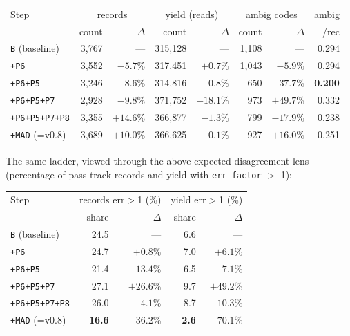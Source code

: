 \documentclass[11pt]{article}
\begin{document}
\begin{center}
\begin{tabular}{l rr rr rr r}
\toprule
Step & \multicolumn{2}{c}{records} & \multicolumn{2}{c}{yield (reads)} & \multicolumn{2}{c}{ambig codes} & ambig \\
& count & $\Delta$ & count & $\Delta$ & count & $\Delta$ & /rec \\
\midrule
\texttt{B} (baseline) & 3,767 & --- & 315,128 & --- & 1,108 & --- & 0.294 \\
\texttt{+P6} & 3,552 & $-5.7\%$ & 317,451 & $+0.7\%$ & 1,043 & $-5.9\%$ & 0.294 \\
\texttt{+P6+P5} & 3,246 & $-8.6\%$ & 314,816 & $-0.8\%$ & 650 & $\mathbf{-37.7\%}$ & \textbf{0.200} \\
\texttt{+P6+P5+P7} & 2,928 & $-9.8\%$ & 371,752 & $\mathbf{+18.1\%}$ & 973 & $+49.7\%$ & 0.332 \\
\texttt{+P6+P5+P7+P8} & 3,355 & $+14.6\%$ & 366,877 & $-1.3\%$ & 799 & $\mathbf{-17.9\%}$ & 0.238 \\
\texttt{+MAD} (=v0.8) & 3,689 & $+10.0\%$ & 366,625 & $-0.1\%$ & 927 & $+16.0\%$ & 0.251 \\
\bottomrule
\end{tabular}
\end{center}

The same ladder, viewed through the above-expected-disagreement lens
(percentage of pass-track records and yield with \texttt{err\_factor}
$>$ 1):

\begin{center}
\begin{tabular}{l rr rr}
\toprule
Step & \multicolumn{2}{c}{records err$>$1 (\%)} & \multicolumn{2}{c}{yield err$>$1 (\%)} \\
& share & $\Delta$ & share & $\Delta$ \\
\midrule
\texttt{B} (baseline) & 24.5 & --- & 6.6 & --- \\
\texttt{+P6} & 24.7 & $+0.8\%$ & 7.0 & $+6.1\%$ \\
\texttt{+P6+P5} & 21.4 & $\mathbf{-13.4\%}$ & 6.5 & $-7.1\%$ \\
\texttt{+P6+P5+P7} & 27.1 & $+26.6\%$ & 9.7 & $\mathbf{+49.2\%}$ \\
\texttt{+P6+P5+P7+P8} & 26.0 & $-4.1\%$ & 8.7 & $-10.3\%$ \\
\texttt{+MAD} (=v0.8) & \textbf{16.6} & $\mathbf{-36.2\%}$ & \textbf{2.6} & $\mathbf{-70.1\%}$ \\
\bottomrule
\end{tabular}
\end{center}
\end{document}
